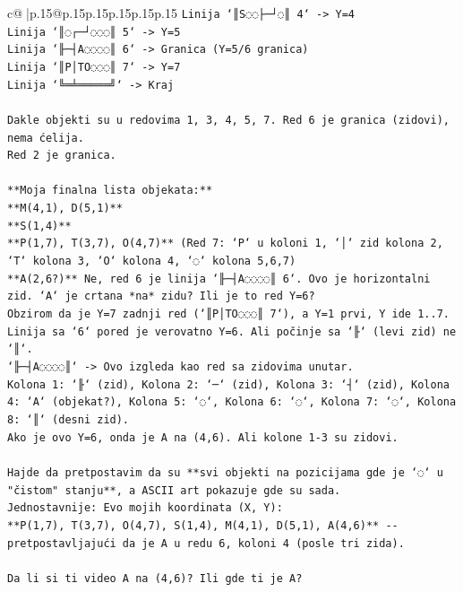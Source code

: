 \documentclass{article}
\begin{document}
{\begin{supertabular}{c@{$\;$}|p{.15\linewidth}@{}p{.15\linewidth}p{.15\linewidth}p{.15\linewidth}p{.15\linewidth}p{.15\linewidth}}
{{{\texttt{Linija `║S◌◌├─┘◌║ 4` {-}> Y=4} \\
\texttt{Linija `║◌┌─┘◌◌◌║ 5` {-}> Y=5} \\
\texttt{Linija `╟─┤A◌◌◌◌║ 6` {-}> Granica (Y=5/6 granica)} \\
\texttt{Linija `║P│TO◌◌◌║ 7` {-}> Y=7} \\
\texttt{Linija `╚═╧═════╝` {-}> Kraj} \\
\\ 
\texttt{Dakle objekti su u redovima 1, 3, 4, 5, 7. Red 6 je granica (zidovi), nema ćelija.} \\
\texttt{Red 2 je granica.} \\
\\ 
\texttt{**Moja finalna lista objekata:**} \\
\texttt{**M(4,1), D(5,1)**} \\
\texttt{**S(1,4)**} \\
\texttt{**P(1,7), T(3,7), O(4,7)**  (Red 7: `P` u koloni 1, `│` zid kolona 2, `T` kolona 3, `O` kolona 4, `◌` kolona 5,6,7)} \\
\texttt{**A(2,6?)** Ne, red 6 je linija `╟─┤A◌◌◌◌║ 6`. Ovo je horizontalni zid. `A` je crtana *na* zidu? Ili je to red Y=6?} \\
\texttt{Obzirom da je Y=7 zadnji red (`║P│TO◌◌◌║ 7`), a Y=1 prvi, Y ide 1..7.} \\
\texttt{Linija sa `6` pored je verovatno Y=6. Ali počinje sa `╟` (levi zid) ne `║`.} \\
\texttt{`╟─┤A◌◌◌◌║` {-}> Ovo izgleda kao red sa zidovima unutar.} \\
\texttt{Kolona 1: `╟` (zid), Kolona 2: `─` (zid), Kolona 3: `┤` (zid), Kolona 4: `A` (objekat?), Kolona 5: `◌`, Kolona 6: `◌`, Kolona 7: `◌`, Kolona 8: `║` (desni zid).} \\
\texttt{Ako je ovo Y=6, onda je A na (4,6). Ali kolone 1{-}3 su zidovi.} \\
\\ 
\texttt{Hajde da pretpostavim da su **svi objekti na pozicijama gde je `◌` u "čistom" stanju**, a ASCII art pokazuje gde su sada.} \\
\texttt{Jednostavnije: Evo mojih koordinata (X, Y):} \\
\texttt{**P(1,7), T(3,7), O(4,7), S(1,4), M(4,1), D(5,1), A(4,6)** {-}{-} pretpostavljajući da je A u redu 6, koloni 4 (posle tri zida).} \\
\\ 
\texttt{Da li si ti video A na (4,6)? Ili gde ti je A?} \\
}}}
\end{supertabular}}
\end{document}
